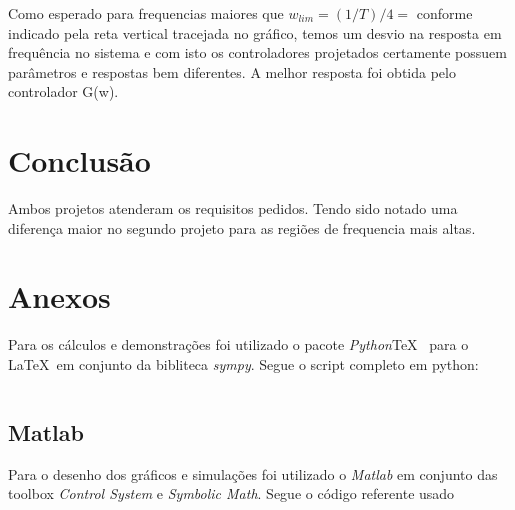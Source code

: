 \documentclass[a4paper,11pt]{article}
\begin{document}
Como esperado para frequencias maiores que $w_{lim} =(1/T)/4 = $ conforme indicado pela reta vertical tracejada no gráfico, temos um desvio na resposta em frequência no sistema e com isto os controladores projetados certamente possuem parâmetros e respostas bem diferentes. A melhor resposta foi obtida pelo controlador G(w). 

\section{Conclusão}

Ambos projetos atenderam os requisitos pedidos. Tendo sido notado uma diferença maior no segundo projeto para as regiões de frequencia mais altas.


\newpage

\nocite{sympy}
\nocite{pythontex}
\nocite{matlabcontrol}
\nocite{matlabsymbolic}
\nocite{briandougla_book2020}

\newpage
\section*{Anexos}

Para os cálculos e demonstrações foi utilizado o pacote \textit{Python}\TeX\ \cite{pythontex} para o \LaTeX\ em conjunto da bibliteca \textit{sympy}\cite{sympy}. Segue o script completo em python:

\inputminted[xleftmargin=15pt,linenos,frame=single,framesep=5pt,breaklines=true]{python}{../python/exsim4.py}

\newpage
\subsection*{Matlab}

Para o desenho dos gráficos e simulações foi utilizado o \textit{Matlab} em conjunto das toolbox \textit{Control System}\cite{matlabcontrol} e \textit{Symbolic Math}\cite{matlabsymbolic}. Segue o código referente usado
\end{document}
